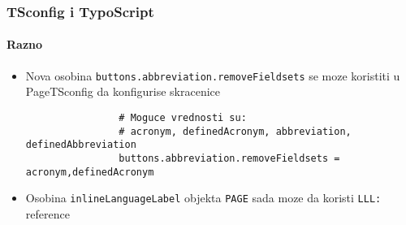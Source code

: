 \begin{frame}[fragile]
	\frametitle{TSconfig i TypoScript}
	\framesubtitle{Razno}

	\begin{itemize}
		\item Nova osobina \texttt{buttons.abbreviation.removeFieldsets} se moze koristiti u
			PageTSconfig da konfigurise skracenice

			\begin{lstlisting}
				# Moguce vrednosti su:
				# acronym, definedAcronym, abbreviation, definedAbbreviation
				buttons.abbreviation.removeFieldsets = acronym,definedAcronym
			\end{lstlisting}

		\item Osobina \texttt{inlineLanguageLabel} objekta \texttt{PAGE} sada moze da koristi\newline
			\texttt{LLL:} reference

	\end{itemize}

\end{frame}

